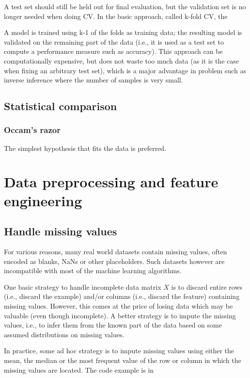 \begin{refsection}
A test set should still be held out for final evaluation, but the validation set is no longer needed when doing CV. In the basic approach, called k-fold CV, the

A model is trained using k-1 of the folds as training data;
the resulting model is validated on the remaining part of the data (i.e., it is used as a test set to compute a performance measure such as accuracy).
 This approach can be computationally expensive, but does not waste too much data (as it is the case when fixing an arbitrary test set), which is a major advantage in problem such as inverse inference where the number of samples is very small.
 
 
\subsection{Statistical comparison}
 



\subsubsection{Occam's razor}
The simplest hypothesis that fits the data is preferred.


\section{Data preprocessing and feature engineering}




\subsection{Handle missing values}


For various reasons, many real world datasets contain missing values, often encoded as blanks, NaNs or other placeholders. Such datasets however are incompatible with most of the machine learning algorithms.  

One basic strategy to handle incomplete data matrix $X$ is to discard entire rows (i.e., discard the example) and/or columns (i.e., discard the feature) containing missing values. However, this comes at the price of losing data which may be valuable (even though incomplete). A better strategy is to impute the missing values, i.e., to infer them from the known part of the data based on some assumed distributions on missing values.

In practice, some ad hoc strategy is to impute missing values using either the mean, the median or the most frequent value of the row or column in which the missing values are located. The code example is in 



\end{refsection}
